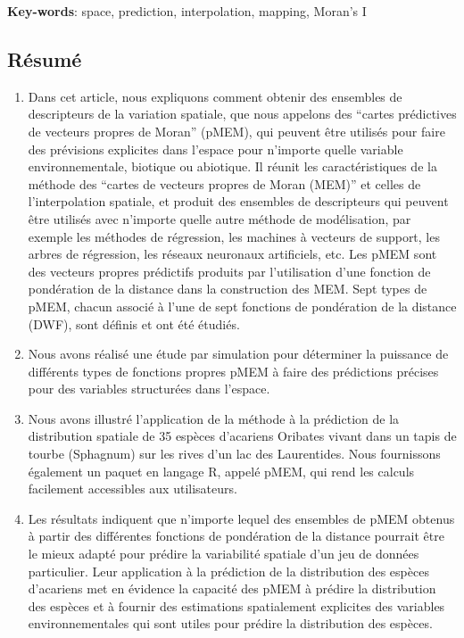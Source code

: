 \documentclass[
]{article}
\providecommand{\tightlist}{%
  \setlength{\itemsep}{0pt}\setlength{\parskip}{0pt}}
\begin{document}
\textbf{Key-words}: space, prediction, interpolation, mapping, Moran's I

\subsection{Résumé}\label{ruxe9sumuxe9}

\begin{enumerate}
\def\labelenumi{\arabic{enumi}.}
\tightlist
\item
  Dans cet article, nous expliquons comment obtenir des ensembles de
  descripteurs de la variation spatiale, que nous appelons des ``cartes
  prédictives de vecteurs propres de Moran'' (pMEM), qui peuvent être
  utilisés pour faire des prévisions explicites dans l'espace pour
  n'importe quelle variable environnementale, biotique ou abiotique. Il
  réunit les caractéristiques de la méthode des ``cartes de vecteurs
  propres de Moran (MEM)'' et celles de l'interpolation spatiale, et
  produit des ensembles de descripteurs qui peuvent être utilisés avec
  n'importe quelle autre méthode de modélisation, par exemple les
  méthodes de régression, les machines à vecteurs de support, les arbres
  de régression, les réseaux neuronaux artificiels, etc. Les pMEM sont
  des vecteurs propres prédictifs produits par l'utilisation d'une
  fonction de pondération de la distance dans la construction des MEM.
  Sept types de pMEM, chacun associé à l'une de sept fonctions de
  pondération de la distance (DWF), sont définis et ont été étudiés.
\item
  Nous avons réalisé une étude par simulation pour déterminer la
  puissance de différents types de fonctions propres pMEM à faire des
  prédictions précises pour des variables structurées dans l'espace.
\item
  Nous avons illustré l'application de la méthode à la prédiction de la
  distribution spatiale de 35 espèces d'acariens Oribates vivant dans un
  tapis de tourbe (Sphagnum) sur les rives d'un lac des Laurentides.
  Nous fournissons également un paquet en langage R, appelé pMEM, qui
  rend les calculs facilement accessibles aux utilisateurs.
\item
  Les résultats indiquent que n'importe lequel des ensembles de pMEM
  obtenus à partir des différentes fonctions de pondération de la
  distance pourrait être le mieux adapté pour prédire la variabilité
  spatiale d'un jeu de données particulier. Leur application à la
  prédiction de la distribution des espèces d'acariens met en évidence
  la capacité des pMEM à prédire la distribution des espèces et à
  fournir des estimations spatialement explicites des variables
  environnementales qui sont utiles pour prédire la distribution des
  espèces.
\end{enumerate}
\end{document}
